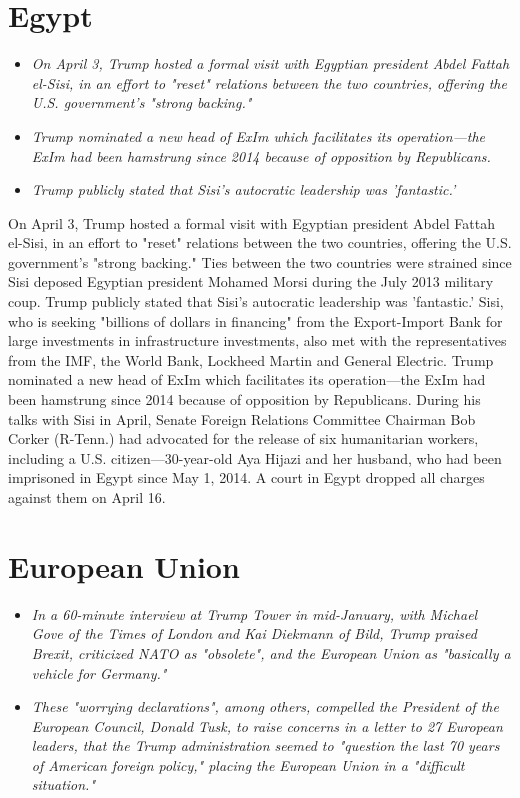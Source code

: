 \section{Egypt}\label{egypt}

\begin{itemize}
\item
  \emph{On April 3, Trump hosted a formal visit with Egyptian president
  Abdel Fattah el-Sisi, in an effort to "reset" relations between the
  two countries, offering the U.S. government's "strong backing."}
\item
  \emph{Trump nominated a new head of ExIm which facilitates its
  operation---the ExIm had been hamstrung since 2014 because of
  opposition by Republicans.}
\item
  \emph{Trump publicly stated that Sisi's autocratic leadership was
  'fantastic.'}
\end{itemize}

On April 3, Trump hosted a formal visit with Egyptian president Abdel
Fattah el-Sisi, in an effort to "reset" relations between the two
countries, offering the U.S. government's "strong backing." Ties between
the two countries were strained since Sisi deposed Egyptian president
Mohamed Morsi during the July 2013 military coup. Trump publicly stated
that Sisi's autocratic leadership was 'fantastic.' Sisi, who is seeking
"billions of dollars in financing" from the Export-Import Bank for large
investments in infrastructure investments, also met with the
representatives from the IMF, the World Bank, Lockheed Martin and
General Electric. Trump nominated a new head of ExIm which facilitates
its operation---the ExIm had been hamstrung since 2014 because of
opposition by Republicans. During his talks with Sisi in April, Senate
Foreign Relations Committee Chairman Bob Corker (R-Tenn.) had advocated
for the release of six humanitarian workers, including a U.S.
citizen---30-year-old Aya Hijazi and her husband, who had been
imprisoned in Egypt since May 1, 2014. A court in Egypt dropped all
charges against them on April 16.

\section{European Union}\label{european-union}

\begin{itemize}
\item
  \emph{In a 60-minute interview at Trump Tower in mid-January, with
  Michael Gove of the Times of London and Kai Diekmann of Bild, Trump
  praised Brexit, criticized NATO as "obsolete", and the European Union
  as "basically a vehicle for Germany."}
\item
  \emph{These "worrying declarations", among others, compelled the
  President of the European Council, Donald Tusk, to raise concerns in a
  letter to 27 European leaders, that the Trump administration seemed to
  "question the last 70 years of American foreign policy," placing the
  European Union in a "difficult situation."}
\end{itemize}

